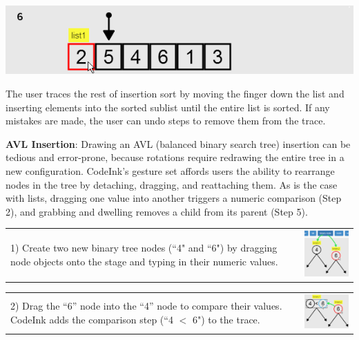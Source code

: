 \noindent \includegraphics[width=0.7\columnwidth]{img/examples/insertion-6.png}

The user traces the rest of insertion sort by moving the finger down the
list and inserting elements into the sorted sublist until the entire
list is sorted. If any mistakes are made, the user can undo steps to
remove them from the trace.


\noindent \textbf{AVL Insertion}: Drawing an AVL (balanced binary search
tree) insertion can be tedious and error-prone, because rotations
require redrawing the entire tree in a new configuration. CodeInk's
gesture set affords users the ability to rearrange nodes in the tree by
detaching, dragging, and reattaching them. As is the case with lists,
dragging one value into another triggers a numeric comparison (Step 2),
and grabbing and dwelling removes a child from its parent (Step 5).


\noindent \begin{tabular}{m{4.6cm} m{3.4cm}}

1) Create two new binary tree nodes (``4" and ``6") by dragging node
objects onto the stage and typing in their numeric values.

& \includegraphics[width=3.4cm]{img/examples/bst-1.png}
\end{tabular}


\noindent \begin{tabular}{m{4.6cm} m{3.4cm}}

2) Drag the ``6'' node into the ``4'' node to compare their values.
CodeInk adds the comparison step (``4 $<$ 6") to the trace.

& \includegraphics[width=3.4cm]{img/examples/bst-2.png}
\end{tabular}

